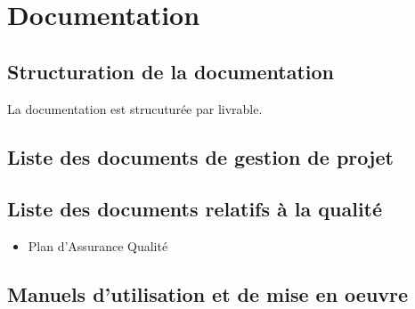 \section{Documentation}

\subsection{Structuration de la documentation}
La documentation est strucuturée par livrable.

\subsection{Liste des documents de gestion de projet}


\subsection{Liste des documents relatifs à la qualité}

\begin{itemize}
    \item Plan d'Assurance Qualité
\end{itemize}

\subsection{Manuels d'utilisation et de mise en oeuvre}
\pagebreak
